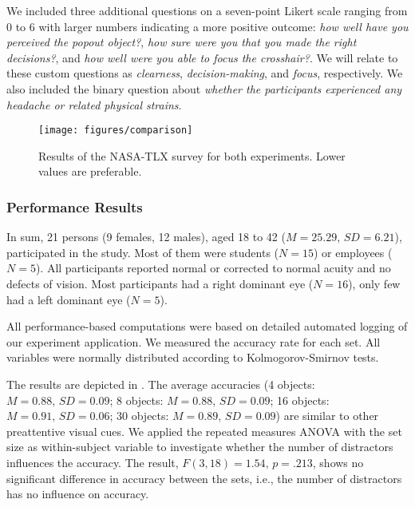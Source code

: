 \documentclass[journal]{vgtc}                %
\begin{document}
We included three additional questions on a seven-point Likert scale ranging from 0 to 6 with larger numbers indicating a more positive outcome: \textit{how well have you perceived the popout object?}, \textit{how sure were you that you made the right decisions?}, and \textit{how well were you able to focus the crosshair?}. We will relate to these custom questions as \textit{clearness}, \textit{decision-making}, and \textit{focus}, respectively. We also included the binary question about \textit{whether the participants experienced any headache or related physical strains}.






\begin{figure*}[t!]
\centering
\texttt{[image: figures/comparison]}
\caption{Results of the NASA-TLX survey for both experiments. Lower values are preferable.}
\label{fig:nasa}
\end{figure*}




\subsubsection{Performance Results}

In sum, 21 persons (9 females, 12 males), aged 18 to 42 ($M = 25.29,\,SD = 6.21$), participated in the study. Most of them were students ($N = 15$) or employees ($N = 5$). All participants reported normal or corrected to normal acuity and no defects of vision. Most participants had a right dominant eye ($N = 16$), only few had a left dominant eye ($N = 5$).

All performance-based computations were based on detailed automated logging of our experiment application. We measured the accuracy rate for each set. All variables were normally distributed according to Kolmogorov-Smirnov tests. 

The results are depicted in . The average accuracies (4 objects: $M = 0.88,\,SD = 0.09$; 8 objects: $M = 0.88,\,SD = 0.09$; 16 objects: $M = 0.91,\,SD = 0.06$; 30 objects: $M = 0.89,\,SD = 0.09$) are similar to other preattentive visual cues. We applied the repeated measures ANOVA with the set size as within-subject variable to investigate whether the number of distractors influences the accuracy. The result, $F(3,18) = 1.54,\,p = .213$, shows no significant difference in accuracy between the sets, i.e., the number of distractors has no influence on accuracy.
\end{document}

